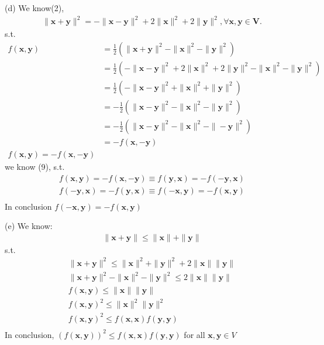 \documentclass[a4paper,12pt]{article}
\begin{document}
(d)
We know(2),
\begin{align*}
    \|\bm{x} + \bm{y}\|^2 = - \|\bm{x} - \bm{y}\|^2 + 2\|\bm{x}\|^2 + 2\|\bm{y}\|^2, \forall \bm{x}, \bm{y} \in \bm{V}.
\end{align*}
s.t.
\begin{align*}
    f(\bm{x}, \bm{y}) &= \frac 1 2 (\|\bm{x} + \bm{y}\|^2 - \|\bm{x}\|^2 - \|\bm{y}\|^2) \\
    &= \frac 1 2 (- \|\bm{x} - \bm{y}\|^2 + 2\|\bm{x}\|^2 + 2\|\bm{y}\|^2 - \|\bm{x}\|^2 - \|\bm{y}\|^2 )  \\
    &= \frac 1 2 (- \|\bm{x} - \bm{y}\|^2 + \|\bm{x}\|^2 + \|\bm{y}\|^2)  \\
    &= -\frac 1 2 (\|\bm{x} - \bm{y}\|^2 - \|\bm{x}\|^2 - \|\bm{y}\|^2)  \\
    &= -\frac 1 2 (\|\bm{x} - \bm{y}\|^2 - \|\bm{x}\|^2 - \|-\bm{y}\|^2)  \\
    &= -f(\bm{x}, -\bm{y}) \\
    f(\bm{x}, \bm{y}) = -f(\bm{x}, -\bm{y})
\end{align*}
we know (9), s.t.
\begin{align*}
    f(\bm{x}, \bm{y}) = -f(\bm{x}, -\bm{y}) \equiv f(\bm{y}, \bm{x}) = -f(-\bm{y}, \bm{x})\\
    f(-\bm{y}, \bm{x}) = -f(\bm{y}, \bm{x}) \equiv f(-\bm{x}, \bm{y}) = -f(\bm{x}, \bm{y}) \\
\end{align*}
In conclusion \(f(-\bm{x}, \bm{y}) = -f(\bm{x}, \bm{y})\)

(e)
We know:
\begin{align*}
    \|\bm{x} + \bm{y}\| \leq \|\bm{x}\| + \|\bm{y}\|
\end{align*}
s.t.
\begin{align*}
    \|\bm{x} + \bm{y}\|^2 \leq \|\bm{x}\|^2 + \|\bm{y}\|^2 + 2\|\bm{x}\|\|\bm{y}\| \\
    \|\bm{x} + \bm{y}\|^2 - \|\bm{x}\|^2 - \|\bm{y}\|^2 \leq 2\|\bm{x}\|\|\bm{y}\| \\
    f(\bm{x}, \bm{y}) \leq \|\bm{x}\|\|\bm{y}\| \\
    f(\bm{x}, \bm{y})^2 \leq \|\bm{x}\|^2\|\bm{y}\|^2 \\
    f(\bm{x}, \bm{y})^2 \leq f(\bm{x}, \bm{x})f(\bm{y}, \bm{y}) \\
\end{align*}
In conclusion, \((f(\bm{x}, \bm{y}))^2 \leq f(\bm{x}, \bm{x})f(\bm{y}, \bm{y})\) for all \(\bm{x}, \bm{y} \in V\)
\end{document}

